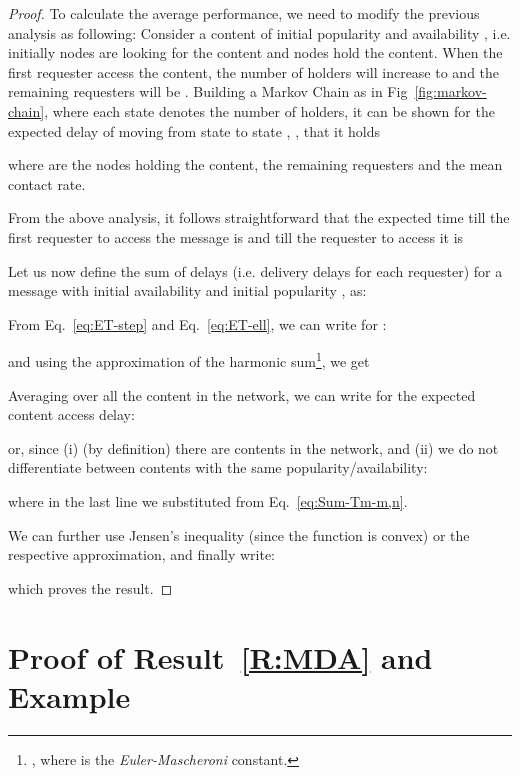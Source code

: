\documentclass[journal]{IEEEtran}
\newcommand{\eq}[1]{Eq.~\eqref{#1}}
\begin{document}
\begin{proof}
To calculate the average performance, we need to modify the previous analysis as following: Consider a content  of initial popularity  and availability , i.e. initially  nodes are looking for the content and  nodes hold the content. When the first requester access the content, the number of holders will increase to  and the remaining requesters will be . Building a Markov Chain as in Fig~\ref{fig:markov-chain}, where each state denotes the number of holders, it can be shown for the expected delay of moving from state  to state , , that it holds

where  are the nodes holding the content,  the remaining requesters and  the mean contact rate.

From the above analysis, it follows straightforward that the expected time till the first requester to access the message is  and till the  requester to access it is 


Let us now define the sum of delays  (i.e. delivery delays for each requester) for a message  with initial availability  and initial popularity , as:

From \eq{eq:ET-step} and \eq{eq:ET-ell}, we can write for :

and using the approximation of the harmonic sum\footnote{, where  is the \textit{Euler-Mascheroni} constant.}, we get


Averaging over all the content in the network, we can write for the expected content access delay:

or, since (i) (by definition) there are  contents in the network, and (ii) we do not differentiate between contents with the same popularity/availability:

where in the last line we substituted from \eq{eq:Sum-Tm-m,n}.

We can further use Jensen's inequality (since the function  is convex) or the respective approximation, and finally write:

which proves the result.
\end{proof}

\section{Proof of Result~\ref{R:MDA} and Example}\label{appendix:R:MDA}
\end{document}
